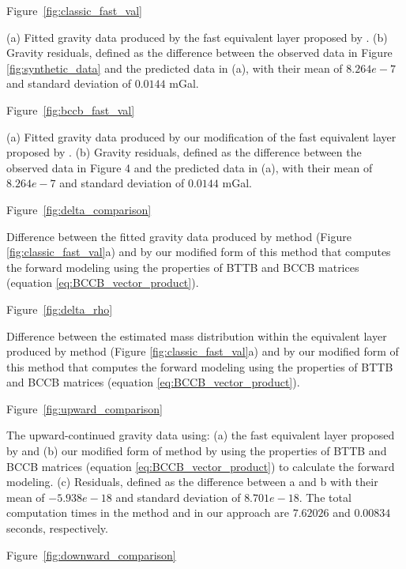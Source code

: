 \documentclass[manuscript,revised]{geophysics}
\begin{document}
Figure~\ref{fig:classic_fast_val}

{(a) Fitted gravity data produced by the fast equivalent layer proposed by \citet{siqueira-etal2017}. (b) Gravity residuals, defined as the difference between the observed data in Figure \ref{fig:synthetic_data} and the predicted data in (a), with their mean of $8.264e-7$ and standard deviation of $0.0144$ mGal.}
\newpage

Figure~\ref{fig:bccb_fast_val}

{(a) Fitted gravity data produced by our modification of the fast equivalent layer proposed by \citet{siqueira-etal2017}. (b) Gravity residuals, defined as the difference between the observed data in Figure 4 and the predicted data in (a), with their mean of $8.264e-7$ and standard deviation of $0.0144$ mGal.}
\newpage

Figure~\ref{fig:delta_comparison}

{Difference between the fitted gravity data produced by \citet{siqueira-etal2017} method (Figure \ref{fig:classic_fast_val}a) and by our modified form of this method that computes the forward modeling using the properties of BTTB and BCCB matrices (equation \ref{eq:BCCB_vector_product}).}
\newpage

Figure~\ref{fig:delta_rho}

{Difference between the estimated mass distribution within the equivalent layer produced by \citet{siqueira-etal2017} method (Figure \ref{fig:classic_fast_val}a) and by our modified form of this method that computes the forward modeling using the properties of BTTB and BCCB matrices (equation \ref{eq:BCCB_vector_product}).}
\newpage

Figure~\ref{fig:upward_comparison}

{The upward-continued gravity data using: (a) the fast equivalent layer proposed by \citet{siqueira-etal2017} and (b) our modified form of \citet{siqueira-etal2017} method by using the properties of BTTB and BCCB matrices (equation \ref{eq:BCCB_vector_product}) to calculate the forward modeling.  (c) Residuals, defined as the difference between a and b with their mean of $-5.938e-18$ and standard deviation of $8.701e-18$.  The total computation times in the \citet{siqueira-etal2017} method and in our approach are $7.62026$ and $0.00834$ seconds, respectively.}
\newpage

Figure~\ref{fig:downward_comparison}
\end{document}
